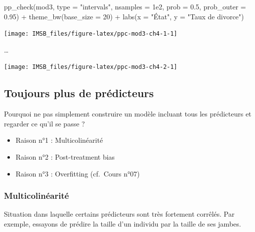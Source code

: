 \documentclass[
  a4paper,11pt,twoside,onecolumn,openright,final,oldfontcommands]{memoir}
\newenvironment{Shaded}{\begin{snugshade}}{\end{snugshade}}
\newcommand{\AttributeTok}[1]{\textcolor[rgb]{0.77,0.63,0.00}{#1}}
\newcommand{\DecValTok}[1]{\textcolor[rgb]{0.00,0.00,0.81}{#1}}
\newcommand{\FloatTok}[1]{\textcolor[rgb]{0.00,0.00,0.81}{#1}}
\newcommand{\FunctionTok}[1]{\textcolor[rgb]{0.00,0.00,0.00}{#1}}
\newcommand{\NormalTok}[1]{#1}
\newcommand{\SpecialCharTok}[1]{\textcolor[rgb]{0.00,0.00,0.00}{#1}}
\newcommand{\StringTok}[1]{\textcolor[rgb]{0.31,0.60,0.02}{#1}}
\providecommand{\tightlist}{%
  \setlength{\itemsep}{0pt}\setlength{\parskip}{0pt}}
\theoremstyle{definition}
\theoremstyle{definition}
\theoremstyle{definition}
\theoremstyle{definition}
\theoremstyle{remark}
\begin{document}
\begin{Shaded}
\begin{Highlighting}[]
\FunctionTok{pp\_check}\NormalTok{(mod3, }\AttributeTok{type =} \StringTok{"intervals"}\NormalTok{, }\AttributeTok{nsamples =} \FloatTok{1e2}\NormalTok{, }\AttributeTok{prob =} \FloatTok{0.5}\NormalTok{, }\AttributeTok{prob\_outer =} \FloatTok{0.95}\NormalTok{) }\SpecialCharTok{+}
  \FunctionTok{theme\_bw}\NormalTok{(}\AttributeTok{base\_size =} \DecValTok{20}\NormalTok{) }\SpecialCharTok{+} \FunctionTok{labs}\NormalTok{(}\AttributeTok{x =} \StringTok{"État"}\NormalTok{, }\AttributeTok{y =} \StringTok{"Taux de divorce"}\NormalTok{)}
\end{Highlighting}
\end{Shaded}

\begin{center}\texttt{[image: IMSB\_files/figure-latex/ppc-mod3-ch4-1-1]} \end{center}

\ldots{}

\begin{center}\texttt{[image: IMSB\_files/figure-latex/ppc-mod3-ch4-2-1]} \end{center}

\hypertarget{toujours-plus-de-pruxe9dicteurs}{%
\subsection{Toujours plus de prédicteurs}\label{toujours-plus-de-pruxe9dicteurs}}

Pourquoi ne pas simplement construire un modèle incluant tous les prédicteurs et regarder ce qu'il se passe ?

\begin{itemize}
\tightlist
\item
  Raison n°1 : Multicolinéarité
\item
  Raison n°2 : Post-treatment bias
\item
  Raison n°3 : Overfitting (cf.~Cours n°07)
\end{itemize}

\hypertarget{multicolinuxe9arituxe9}{%
\subsubsection{Multicolinéarité}\label{multicolinuxe9arituxe9}}

Situation dans laquelle certains prédicteurs sont très fortement corrêlés. Par exemple, essayons de prédire la taille d'un individu par la taille de ses jambes.
\end{document}

